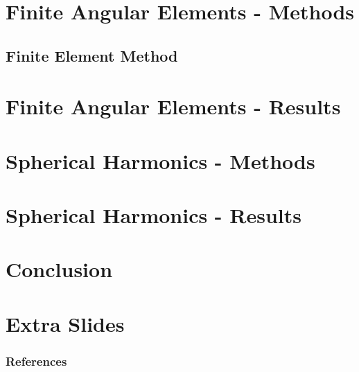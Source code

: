\documentclass[9pt]{beamer}
\begin{document}
\section{Finite Angular Elements - Methods}

\subsection{Finite Element Method}



% 

\section{Finite Angular Elements - Results}


\section{Spherical Harmonics - Methods}


\section{Spherical Harmonics - Results}


\section{Conclusion}



\section{Extra Slides}


% 
\begin{frame}[allowframebreaks]
  \frametitle{References}
  
  {\footnotesize  }

\end{frame}

\end{document}
